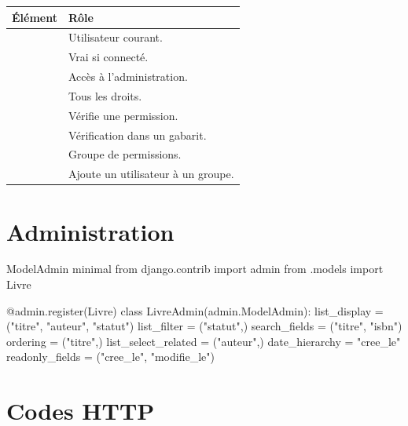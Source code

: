 \begin{longtable}{L{6.0cm} L{9.2cm}}
\toprule
\textbf{Élément} & \textbf{Rôle} \\
\midrule
\endhead
{} & Utilisateur courant. \\
 & Vrai si connecté. \\
 & Accès à l'administration. \\
 & Tous les droits. \\
 & Vérifie une permission. \\
 & Vérification dans un gabarit. \\
 & Groupe de permissions. \\
 & Ajoute un utilisateur à un groupe. \\
\bottomrule
\end{longtable}

\section{Administration}

\begin{codebox}[python]{ModelAdmin minimal}
from django.contrib import admin
from .models import Livre


@admin.register(Livre)
class LivreAdmin(admin.ModelAdmin):
    list_display = ("titre", "auteur", "statut")
    list_filter = ("statut",)
    search_fields = ("titre", "isbn")
    ordering = ("titre",)
    list_select_related = ("auteur",)
    date_hierarchy = "cree_le"
    readonly_fields = ("cree_le", "modifie_le")
\end{codebox}

\section{Codes HTTP}

